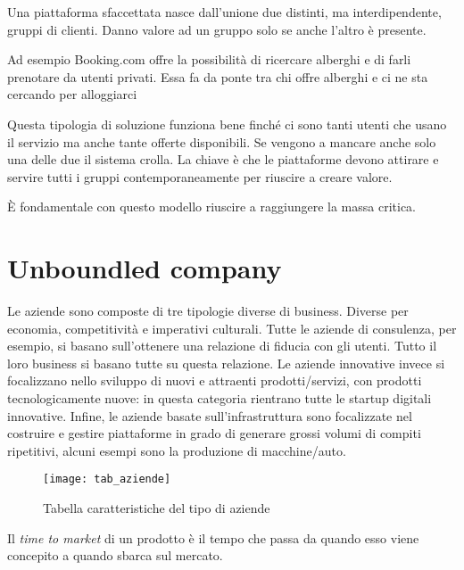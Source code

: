 Una piattaforma sfaccettata nasce dall'unione due distinti, ma interdipendente,
gruppi di clienti. Danno valore ad un gruppo solo se anche l'altro è presente.

\begin{example}
Ad esempio Booking.com offre la possibilità di ricercare alberghi e di farli
prenotare da utenti privati. Essa fa da ponte tra chi offre alberghi e ci ne
sta cercando per alloggiarci
\end{example}

Questa tipologia di soluzione funziona bene finché ci sono tanti utenti che
usano il servizio ma anche tante offerte disponibili. Se vengono a mancare
anche solo una delle due il sistema crolla. La chiave è che le piattaforme
devono attirare e servire tutti i gruppi contemporaneamente per riuscire a
creare valore.

\begin{example}[Pubblicità]
\end{example}

È fondamentale con questo modello riuscire a raggiungere la massa critica.

\chapter{Unboundled company}

Le aziende sono composte di tre tipologie diverse di business. Diverse per
economia, competitività e imperativi culturali.
Tutte le aziende di consulenza, per esempio, si basano sull'ottenere una
relazione di fiducia con gli utenti. Tutto il loro business si basano tutte su
questa relazione. Le aziende innovative invece si focalizzano nello sviluppo di
nuovi e attraenti prodotti/servizi, con prodotti tecnologicamente nuove: in
questa categoria rientrano tutte le startup digitali innovative. Infine, le
aziende basate sull'infrastruttura sono focalizzate nel costruire e gestire
piattaforme in grado di generare grossi volumi di compiti ripetitivi, alcuni
esempi sono la produzione di macchine/auto.

\begin{figure}[t]
 \centering
 \texttt{[image: tab\_aziende]}
 \caption{Tabella caratteristiche del tipo di aziende}
 \label{fig:bmi:tab_aziende}
\end{figure}

\begin{definition}
Il \textit{time to market} di un prodotto è il tempo che passa da quando esso
viene concepito a quando sbarca sul mercato.
\end{definition}

